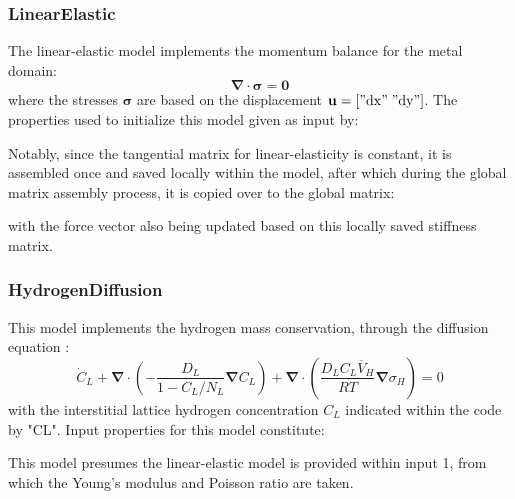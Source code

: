 \documentclass[3p]{elsarticle} %
\begin{document}
\subsubsection{LinearElastic}
The linear-elastic model implements the momentum balance for the metal domain:
\begin{equation}
	\bm{\nabla}\cdot\bm{\sigma} = \mathbf{0}
\end{equation}
where the stresses $\bm{\sigma}$ are based on the displacement $\mathbf{u}=["\mathrm{dx}"\;"\mathrm{dy}"]$. The properties used to initialize this model given as input by:

Notably, since the tangential matrix for linear-elasticity is constant, it is assembled once and saved locally within the model, after which during the global matrix assembly process, it is copied over to the global matrix:

with the force vector also being updated based on this locally saved stiffness matrix. 

\subsubsection{HydrogenDiffusion}
This model implements the hydrogen mass conservation, through the diffusion equation \citep{Oriani1974, Martinez-Paneda2020, Kristensen2020a, Golahmar2021}:
\begin{equation}
    \dot{C}_L + \bm{\nabla}\cdot\left(-\frac{D_L}{1-C_L/N_L} \bm{\nabla}C_L \right) + \bm{\nabla}\cdot\left(\frac{D_L C_L \overline{V}_H}{RT}\bm{\nabla}\sigma_H\right) = 0
\end{equation}
with the interstitial lattice hydrogen concentration $C_L$ indicated within the code by "CL". Input properties for this model constitute:

This model presumes the linear-elastic model is provided within input 1, from which the Young's modulus and Poisson ratio are taken.
\end{document}
